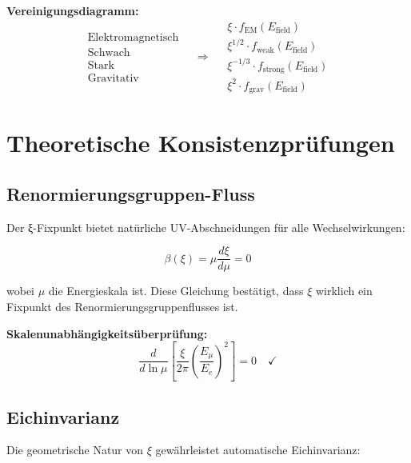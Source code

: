 \documentclass[12pt,a4paper]{report}
\begin{document}
	\textbf{Vereinigungsdiagramm:}
	\begin{equation}
		\begin{array}{c}
			\text{Elektromagnetisch} \\
			\text{Schwach} \\
			\text{Stark} \\
			\text{Gravitativ}
		\end{array} \quad \Rightarrow \quad
		\begin{array}{c}
			\xi \cdot f_{\text{EM}}(E_{\text{field}}) \\
			\xi^{1/2} \cdot f_{\text{weak}}(E_{\text{field}}) \\
			\xi^{-1/3} \cdot f_{\text{strong}}(E_{\text{field}}) \\
			\xi^2 \cdot f_{\text{grav}}(E_{\text{field}})
		\end{array}
	\end{equation}
	
	\section{Theoretische Konsistenzprüfungen}
	\label{sec:consistency_checks}
	
	\subsection{Renormierungsgruppen-Fluss}
	\label{subsec:renormalization_flow}
	
	Der ξ-Fixpunkt bietet natürliche UV-Abschneidungen für alle Wechselwirkungen:
	
	\begin{equation}
		\beta(\xi) = \mu \frac{d\xi}{d\mu} = 0
	\end{equation}
	
	wobei $\mu$ die Energieskala ist. Diese Gleichung bestätigt, dass $\xi$ wirklich ein Fixpunkt des Renormierungsgruppenflusses ist.
	
	\textbf{Skalenunabhängigkeitsüberprüfung:}
	\begin{equation}
		\frac{d}{d\ln\mu}\left[\frac{\xi}{2\pi}\left(\frac{E_\mu}{E_e}\right)^2\right] = 0 \quad \checkmark
	\end{equation}
	
	\subsection{Eichinvarianz}
	\label{subsec:gauge_invariance}
	
	Die geometrische Natur von $\xi$ gewährleistet automatische Eichinvarianz:
	
\end{document}
